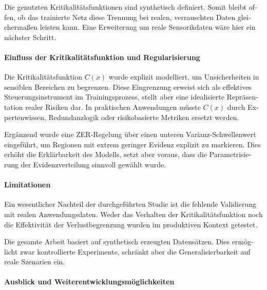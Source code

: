 \begin{otherlanguage}{ngerman}
Die genutzten Kritikalitätsfunktionen sind synthetisch definiert. 
Somit bleibt offen, ob das trainierte Netz diese Trennung bei realen, verrauschten Daten gleichermaßen leisten kann. Eine Erweiterung um reale Sensorikdaten wäre hier ein nächster Schritt.

\paragraph{Einfluss der Kritikalitätsfunktion und Regularisierung}

Die Kritikalitätsfunktion $C(x)$ wurde explizit modelliert, um Unsicherheiten in sensiblen Bereichen zu begrenzen. Diese Eingrenzung erweist sich als effektives Steuerungsinstrument im Trainingsprozess, stellt aber eine idealisierte Repräsentation realer Risiken dar. In praktischen Anwendungen müsste $C(x)$ durch Expertenwissen, Redundanzlogik oder risikobasierte Metriken ersetzt werden.

Ergänzend wurde eine ZER-Regelung über einen unteren Varianz-Schwellenwert eingeführt, um Regionen mit extrem geringer Evidenz explizit zu markieren. Dies erhöht die Erklärbarkeit des Modells, setzt aber voraus, dass die Parametrisierung der Evidenzverteilung sinnvoll gewählt wurde.

\paragraph{Limitationen}

Ein wesentlicher Nachteil der durchgeführten Studie ist die fehlende Validierung mit realen Anwendungsdaten. 
Weder das Verhalten der Kritikalitätsfunktion noch die Effektivität der Verlustbegrenzung wurden im produktiven Kontext getestet. 

Die gesamte Arbeit basiert auf synthetisch erzeugten Datensätzen. 
Dies ermöglicht zwar kontrollierte Experimente, schränkt aber die Generalisierbarkeit auf reale Szenarien ein.

\paragraph{Ausblick und Weiterentwicklungsmöglichkeiten}


\end{otherlanguage}
